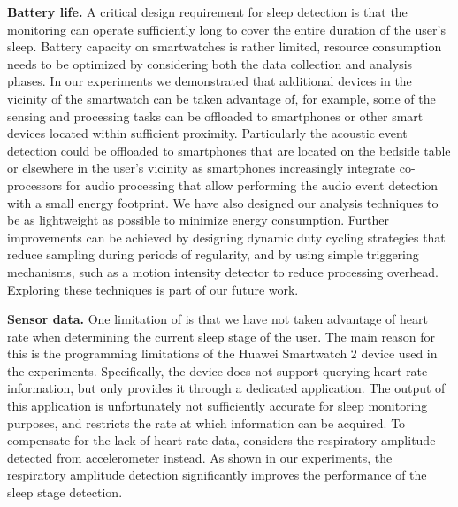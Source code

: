 \textbf{Battery life.} A critical design requirement for sleep detection is that the monitoring can operate sufficiently long to cover the entire duration of the user's sleep. Battery capacity on smartwatches is rather limited, resource consumption needs to be optimized by considering both the data collection and analysis phases. In our experiments we demonstrated that additional devices in the vicinity of the smartwatch can be taken advantage of, for example, some of the sensing and processing tasks can be offloaded to smartphones or other smart devices located within sufficient proximity. Particularly the acoustic event detection could be offloaded to smartphones that are located on the bedside table or elsewhere in the user's vicinity as smartphones increasingly integrate co-processors for audio processing that allow performing the audio event detection with a small energy footprint. We have also designed our analysis techniques to be as lightweight as possible to minimize energy consumption. Further improvements can be achieved by designing dynamic duty cycling strategies that reduce sampling during periods of regularity, and by using simple triggering mechanisms, such as a motion intensity detector to reduce processing overhead. Exploring these techniques is part of our future work.


\textbf{Sensor data.} One limitation of {\systemname} is that we have not taken advantage of heart rate when determining the current sleep stage of the user. The main reason for this is the programming limitations of the Huawei Smartwatch 2 device used in the experiments. Specifically, the device does not support querying heart rate information, but only provides it through a dedicated application. The output of this application is unfortunately not sufficiently accurate for sleep monitoring purposes, and restricts the rate at which information can be acquired. To compensate for the lack of heart rate data, {\systemname} considers the respiratory amplitude detected from accelerometer instead. As shown in our experiments, the respiratory amplitude detection significantly improves the performance of the sleep stage detection.

